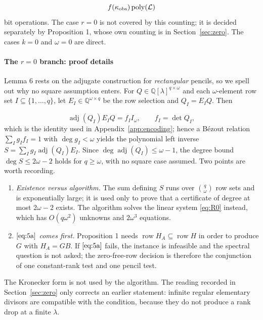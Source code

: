 \documentclass[journal]{IEEEtran}
\theoremstyle{plainn}
\begin{document}
\begin{equation}
f(\kappa_{\rm obs})\operatorname{poly}(\mathcal L)
\end{equation}
bit operations. The case $r=0$ is not covered by this counting; it is decided separately by Proposition 1, whose own counting is in Section~\ref{sec:zero}. The cases $k=0$ and $\omega=0$ are direct.

\paragraph*{The $r=0$ branch: proof details}
Lemma 6 rests on the adjugate construction for \emph{rectangular} pencils, so we spell out why no square assumption enters. For $Q\in\mathbb Q[\lambda]^{q\times\omega}$ and each $\omega$-element row set $I\subseteq\{1,\dots,q\}$, let $E_I\in\mathbb Q^{\omega\times q}$ be the row selection and $Q_I=E_IQ$. Then

\begin{equation}
\operatorname{adj}(Q_I)E_IQ=f_II_\omega,\qquad f_I=\det Q_I,
\end{equation}
which is the identity used in Appendix~\ref{app:encoding}; hence a B\'ezout relation $\sum_Ig_If_I=1$ with $\deg g_I<\omega$ yields the polynomial left inverse $S=\sum_Ig_I\operatorname{adj}(Q_I)E_I$. Since $\deg\operatorname{adj}(Q_I)\le\omega-1$, the degree bound $\deg S\le2\omega-2$ holds for $q\ge\omega$, with no square case assumed. Two points are worth recording.

\begin{enumerate}
\item \emph{Existence versus algorithm.} The sum defining $S$ runs over $\binom q\omega$ row sets and is exponentially large; it is used only to prove that a certificate of degree at most $2\omega-2$ exists. The algorithm solves the linear system \eqref{eq:R0} instead, which has $O(q\omega^2)$ unknowns and $2\omega^3$ equations.
\item \emph{$\eqref{eq:5a}$ comes first.} Proposition 1 needs $\operatorname{row}H_A\subseteq\operatorname{row}H$ in order to produce $G$ with $H_A=GB$. If $\eqref{eq:5a}$ fails, the instance is infeasible and the spectral question is not asked; the zero-free-row decision is therefore the conjunction of one constant-rank test and one pencil test.
\end{enumerate}
The Kronecker form is not used by the algorithm. The reading recorded in Section~\ref{sec:zero} only corrects an earlier statement: infinite regular elementary divisors are compatible with the condition, because they do not produce a rank drop at a finite $\lambda$.
\end{document}
